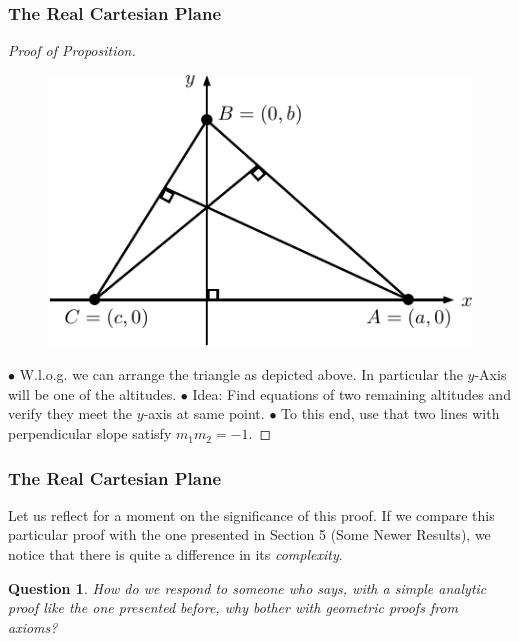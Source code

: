 \documentclass[compress,mathserif,serif]{beamer}
\newtheorem{question}{Question}
\begin{document}
\begin{frame}
\frametitle{The Real Cartesian Plane}
\begin{proof}[Proof of Proposition]
\begin{figure}[hbtp]
\centering
\includegraphics[scale=.7]{prop1.pdf}
\end{figure}
$\bullet$ W.l.o.g. we can arrange the triangle as depicted above. In particular the $y$-Axis will be one of the altitudes.
\pause
\newline $\bullet$ Idea: Find equations of two remaining altitudes and verify they meet the $y$-axis at same point.
\pause
\newline $\bullet$ To this end, use that two lines with perpendicular slope satisfy $m_1m_2=-1$.

\end{proof}

\end{frame}


\begin{frame}
\frametitle{The Real Cartesian Plane}
Let us reflect for a moment on the significance of this proof. If we compare this
particular proof with the one presented in Section 5 (Some Newer Results), we notice that there is quite a
difference in its
\textit{complexity}.
\pause 
\begin{question}How do we
respond to someone who says, with a simple analytic proof like the one presented before, why bother with geometric proofs from axioms?
\end{question}
\end{frame}
\end{document}
